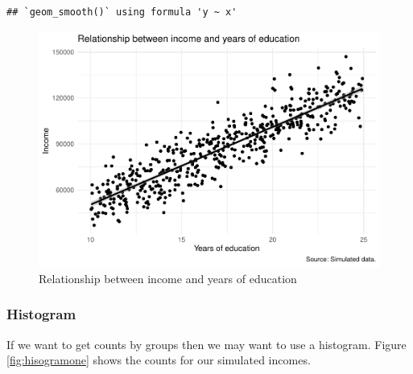 \documentclass[
]{book}
\newenvironment{Shaded}{\begin{snugshade}}{\end{snugshade}}
\newcommand{\DataTypeTok}[1]{\textcolor[rgb]{0.13,0.29,0.53}{#1}}
\newcommand{\KeywordTok}[1]{\textcolor[rgb]{0.13,0.29,0.53}{\textbf{#1}}}
\newcommand{\NormalTok}[1]{#1}
\newcommand{\OperatorTok}[1]{\textcolor[rgb]{0.81,0.36,0.00}{\textbf{#1}}}
\newcommand{\StringTok}[1]{\textcolor[rgb]{0.31,0.60,0.02}{#1}}
\begin{document}
\begin{verbatim}
## `geom_smooth()` using formula 'y ~ x'
\end{verbatim}

\begin{figure}
\centering
\includegraphics{telling_stories_with_data_files/figure-latex/scattorplottwo-1.pdf}
\caption{\label{fig:scattorplottwo}Relationship between income and years of education}
\end{figure}

\hypertarget{histogram}{%
\subsubsection{Histogram}\label{histogram}}

If we want to get counts by groups then we may want to use a histogram. Figure \ref{fig:hisogramone} shows the counts for our simulated incomes.

\begin{Shaded}
\end{Shaded}
\end{document}
